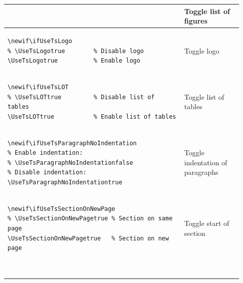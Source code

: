 \begin{footnotesize}
\begin{longtable}{ | p{0.7\linewidth} | p{0.23\linewidth} | }
\begin{BVerbatim}[baseline=t]
        \end{BVerbatim}
         & Toggle list \newline of figures                                     \\
        \hline
        \begin{BVerbatim}[baseline=t]
% Switch to enable logo
\newif\ifUseTsLogo
% \UseTsLogotrue        % Disable logo
\UseTsLogotrue          % Enable logo
        \end{BVerbatim}
         & Toggle logo                                                         \\
        \hline
        \begin{BVerbatim}[baseline=t]
% Switch to enable list of tables
\newif\ifUseTsLOT
% \UseTsLOTtrue         % Disable list of tables
\UseTsLOTtrue           % Enable list of tables
        \end{BVerbatim}
         & Toggle list \newline of tables                                      \\
        \hline
        \begin{BVerbatim}[baseline=t]
% Switch to disable indentation of paragraphs
\newif\ifUseTsParagraphNoIndentation
% Enable indentation:
% \UseTsParagraphNoIndentationfalse
% Disable indentation:
\UseTsParagraphNoIndentationtrue
        \end{BVerbatim}
         & Toggle indentation \newline of paragraphs                           \\
        \hline
        \begin{BVerbatim}[baseline=t]
% Switch to enable start of section on new page
\newif\ifUseTsSectionOnNewPage
% \UseTsSectionOnNewPagetrue % Section on same page
\UseTsSectionOnNewPagetrue   % Section on new page
        \end{BVerbatim}
         & Toggle start \newline of section                                    \\
        \hline
        \begin{BVerbatim}[baseline=t]

\end{BVerbatim}
\end{longtable}
\end{footnotesize}
